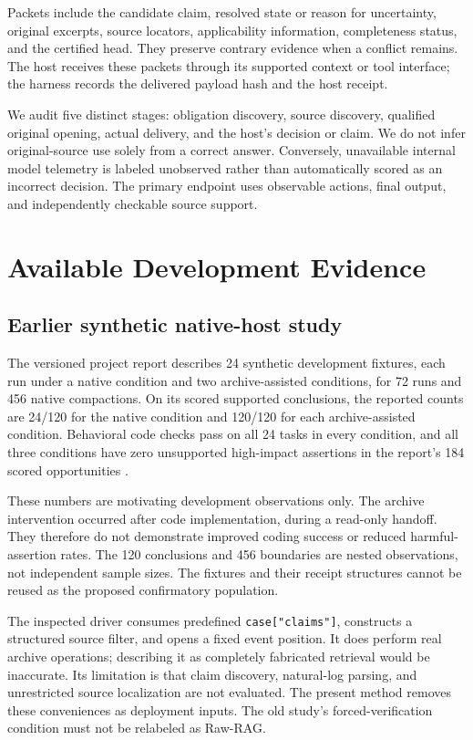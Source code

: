 Packets include the candidate claim, resolved state or reason for
uncertainty, original excerpts, source locators, applicability
information, completeness status, and the certified head. They preserve
contrary evidence when a conflict remains. The host receives these
packets through its supported context or tool interface; the harness
records the delivered payload hash and the host receipt.

We audit five distinct stages: obligation discovery, source discovery,
qualified original opening, actual delivery, and the host's decision or
claim. We do not infer original-source use solely from a correct answer.
Conversely, unavailable internal model telemetry is labeled unobserved
rather than automatically scored as an incorrect decision. The primary
endpoint uses observable actions, final output, and independently
checkable source support.

\section{Available Development
Evidence}\label{available-development-evidence}

\subsection{Earlier synthetic native-host
study}\label{earlier-synthetic-native-host-study}

The versioned project report describes 24 synthetic development
fixtures, each run under a native condition and two archive-assisted
conditions, for 72 runs and 456 native compactions. On its scored
supported conclusions, the reported counts are 24/120 for the native
condition and 120/120 for each archive-assisted condition. Behavioral
code checks pass on all 24 tasks in every condition, and all three
conditions have zero unsupported high-impact assertions in the report's
184 scored opportunities \citep{memex2026pilot}.

These numbers are motivating development observations only. The archive
intervention occurred after code implementation, during a read-only
handoff. They therefore do not demonstrate improved coding success or
reduced harmful-assertion rates. The 120 conclusions and 456 boundaries
are nested observations, not independent sample sizes. The fixtures and
their receipt structures cannot be reused as the proposed confirmatory
population.

The inspected driver consumes predefined \texttt{case{[}"claims"{]}},
constructs a structured source filter, and opens a fixed event position.
It does perform real archive operations; describing it as completely
fabricated retrieval would be inaccurate. Its limitation is that claim
discovery, natural-log parsing, and unrestricted source localization are
not evaluated. The present method removes these conveniences as
deployment inputs. The old study's forced-verification condition must
not be relabeled as Raw-RAG.

